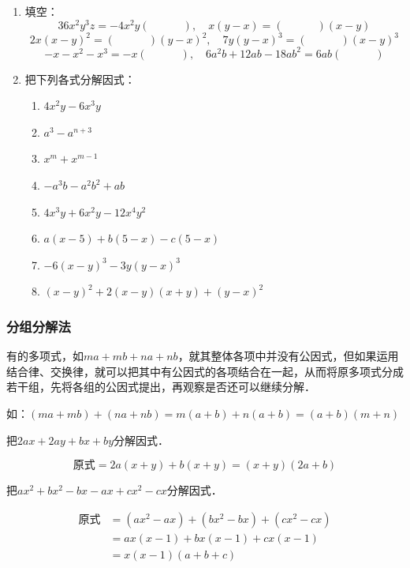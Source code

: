 \begin{ex}
\begin{enumerate}
    \item 填空：
\[36x^2y^3z=-4x^2y(\qquad\quad),\quad x(y-x)=(\qquad\quad)(x-y)  \]
\[2x(x-y)^2=(\qquad\quad)(y-x)^2,\quad 7y(y-x)^3=(\qquad\quad)(x-y)^3\]
\[-x-x^2-x^3=-x(\quad\qquad),\quad 6a^2b+12ab-18ab^2=6ab(\quad\qquad)\]

\item 把下列各式分解因式：
\begin{enumerate}
    \item $4x^2y-6x^3y$
    \item $a^3-a^{n+3}$
    \item $x^m+x^{m-1}$
    \item $-a^3b-a^2b^2+ab$
    \item $4x^3y+6x^2y-12x^4y^2$
    \item $a(x-5)+b(5-x)-c(5-x)$
    \item $-6(x-y)^3-3y(y-x)^3$
    \item $(x-y)^2+2(x-y)(x+y)+(y-x)^2$
\end{enumerate}
\end{enumerate}
\end{ex}

\subsubsection{分组分解法}
有的多项式，如$ma+mb+na+nb$，就其整体各项中并没有公因式，但如果运用结合律、交换律，就可以把其中有公因式的各项结合在一起，从而将原多项式分成若干组，先将各组的公因式提出，再观察是否还可以继续分解．

如：$(ma+mb)+(na+nb)=m(a+b)+n(a+b)=(a+b)(m+n)$

\begin{example}
    把$2ax+2ay+bx+by$分解因式．
\end{example}

\begin{solution}
    \[\text{原式}=2a(x+y)+b(x+y)
    = (x+y) (2a+b)\]
\end{solution}

\begin{example}
    把$ax^2+bx^2-bx-ax+cx^2-cx$分解因式．
\end{example}

\begin{solution}
\[\begin{split}
    \text{原式}&=(ax^2-ax)+(bx^2-bx)+(cx^2-cx)\\
&=ax (x-1) +bx (x-1) +cx (x-1)\\
&=x (x-1) (a+b+c)
\end{split}\]    
\end{solution}

